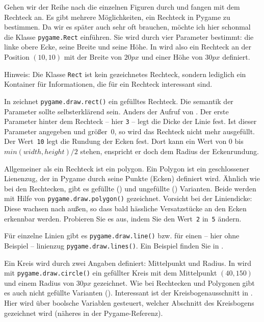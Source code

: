 Gehen wir der Reihe nach die einzelnen Figuren durch und fangen mit dem Rechteck an. Es gibt mehrere Möglichkeiten, ein Rechteck in Pygame zu bestimmen. Da wir es später auch sehr oft brauchen, möchte ich hier schonmal die Klasse \texttt{pygame.Rect} einführen. Sie wird durch vier Parameter bestimmt: die linke obere Ecke, seine Breite und seine Höhe. In  wird also ein Rechteck an der Position $(10,10)$ mit der Breite von $20px$ und einer Höhe von $30px$ definiert. 

Hinweis: Die Klasse \texttt{Rect} ist kein gezeichnetes Rechteck, sondern lediglich ein Kontainer für Informationen, die für ein Rechteck interessant sind. 

In  zeichnet \texttt{pygame.draw.rect()} ein gefülltes Rechteck. Die \Gls{semantik} der Parameter sollte selbsterklärend sein. Anders der Aufruf von . Der erste Parameter hinter dem Rechteck -- hier \texttt{3} -- legt die Dicke der Linie fest. Ist dieser Parameter angegeben und größer~0, so wird das Rechteck nicht mehr ausgefüllt. Der Wert~\texttt{10} legt die Rundung der Ecken fest. Dort kann ein Wert von 0 bis $min(width, height)/2$ stehen, enspricht er doch dem Radius der Eckenrundung.

Allgemeiner als ein Rechteck ist ein \Gls{polygon}. Ein Polygon ist ein geschlossener Lienenzug, der in Pygame durch seine Punkte (Ecken) definiert wird. Ähnlich wie bei den Rechtecken, gibt es gefüllte () und ungefüllte () Varianten. Beide werden mit Hilfe von \texttt{pygame.draw.polygon()} gezeichnet. Vorsicht bei der Liniendicke: Diese wachsen nach außen, so dass bald hässliche Versatzstücke an den Ecken erkennbar werden. Probieren Sie es aus, indem Sie den Wert~\texttt{2} in~\texttt{5} ändern.

Für einzelne Linien gibt es \texttt{pygame.draw.line()} bzw. für einen -- hier ohne Beispiel -- \gls{linienzug} \texttt{pygame.draw.lines()}. Ein Beispiel finden Sie in .

Ein Kreis wird durch zwei Angaben definiert: Mittelpunkt und Radius. In  wird mit \texttt{pygame.draw.circle()} ein gefüllter Kreis mit dem Mittelpunkt $(40, 150)$ und einem Radius von $30px$ gezeichnet. Wie bei Rechtecken und Polygonen gibt es auch nicht gefüllte Varianten (). Interessant ist der Kreisbogenausschnitt in . Hier wird über boolsche Variablen gesteuert, welcher Abschnitt des Kreisbogens gezeichnet wird (näheres in der Pygame-Referenz).


